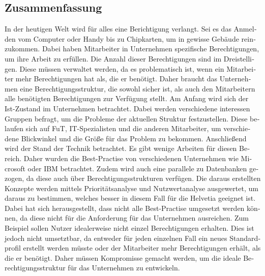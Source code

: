 \begin{otherlanguage}{ngerman}
	\chapter*{Zusammenfassung}
In der heutigen Welt wird für alles eine Berichtigung verlangt.
Sei es das Anmelden vom Computer oder Handy bis zu Chipkarten, um in gewisse Gebäude reinzukommen.
Dabei haben Mitarbeiter in Unternehmen spezifische Berechtigungen, um ihre Arbeit zu erfüllen.
Die Anzahl dieser Berechtigungen sind im Dreistelligen.
Diese müssen verwaltet werden, da es problematisch ist, wenn ein Mitarbeiter mehr Berechtigungen hat als, die er benötigt.
Daher braucht das Unternehmen eine Berechtigungsstruktur, die sowohl sicher ist, als auch den Mitarbeitern alle benötigten Berechtigungen zur Verfügung stellt.
\newline
Am Anfang wird sich der Ist-Zustand im Unternehmen betrachtet.
Dabei werden verschiedene interessen Gruppen befragt, um die Probleme der aktuellen Struktur festzustellen.
Diese belaufen sich auf \ac{FuT}, IT-Spezialisten und die anderen Mitarbeiter, um verschiedene Blickwinkel und die Größe für das Problem zu bekommen.
Anschließend wird der Stand der Technik betrachtet.
Es gibt wenige Arbeiten für diesen Bereich.
Daher wurden die Best-Practise von verschiedenen Unternehmen wie Microsoft oder IBM betrachtet.
Zudem wird auch eine parallele zu Datenbanken gezogen, da diese auch über Berechtigungsstrukturen verfügen.
Die daraus erstellten Konzepte werden mittels Prioritätsanalyse und Nutzwertanalyse ausgewertet, um daraus zu bestimmen, welches besser in diesem Fall für die Helvetia geeignet ist.
\newline
Dabei hat sich herausgestellt, dass nicht alle Best-Practise umgesetzt werden können, da diese nicht für die Anforderung für das Unternehmen ausreichen.
Zum Beispiel sollen Nutzer idealerweise nicht einzel Berechtigungen erhalten.
Dies ist jedoch nicht umsetztbar, da entweder für jeden einzelnen Fall ein neues Standardprofil erstellt werden müsste oder der Mitarbeiter mehr Berechtigungen erhält, als die er benötigt.
Daher müssen Kompromisse gemacht werden, um die ideale Berechtigungsstruktur für das Unternehmen zu entwickeln.
\end{otherlanguage}
